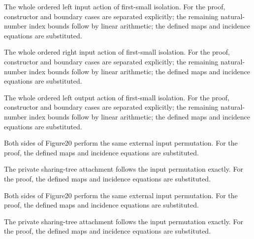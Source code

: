 The whole ordered left input action of first-small isolation.
For the proof, constructor and boundary cases are separated explicitly; the remaining natural-number index bounds follow by linear arithmetic; the defined maps and incidence equations are substituted.
\par{}

The whole ordered right input action of first-small isolation.
For the proof, constructor and boundary cases are separated explicitly; the remaining natural-number index bounds follow by linear arithmetic; the defined maps and incidence equations are substituted.
\par{}

The whole ordered left output action of first-small isolation.
For the proof, constructor and boundary cases are separated explicitly; the remaining natural-number index bounds follow by linear arithmetic; the defined maps and incidence equations are substituted.
\par{}

Both sides of Figure20 perform the same external input permutation.
For the proof, the defined maps and incidence equations are substituted.
\par{}

The private sharing-tree attachment follows the input permutation exactly.
For the proof, the defined maps and incidence equations are substituted.
\par{}

Both sides of Figure20 perform the same external input permutation.
For the proof, the defined maps and incidence equations are substituted.
\par{}

The private sharing-tree attachment follows the input permutation exactly.
For the proof, the defined maps and incidence equations are substituted.
\par{}

